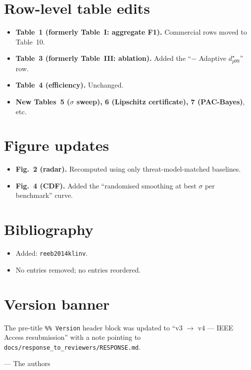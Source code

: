\documentclass[11pt,letterpaper]{article}
\begin{document}
\section{Row-level table edits}
\begin{itemize}[leftmargin=1.4em]
  \item \textbf{Table~1 (formerly Table~I: aggregate F1).} Commercial rows moved to Table~10.
  \item \textbf{Table~3 (formerly Table~III: ablation).} Added the ``$-$ Adaptive $d^\star_{p99}$'' row.
  \item \textbf{Table~4 (efficiency).} Unchanged.
  \item \textbf{New Tables~5 ($\sigma$ sweep), 6 (Lipschitz certificate), 7 (PAC-Bayes)}, etc.
\end{itemize}

\section{Figure updates}
\begin{itemize}[leftmargin=1.4em]
  \item \textbf{Fig.~2 (radar).} Recomputed using only threat-model-matched baselines.
  \item \textbf{Fig.~4 (CDF).} Added the ``randomised smoothing at best $\sigma$ per benchmark'' curve.
\end{itemize}

\section{Bibliography}
\begin{itemize}[leftmargin=1.4em]
  \item Added: \texttt{reeb2014klinv}.
  \item No entries removed; no entries reordered.
\end{itemize}

\section{Version banner}
The pre-title \verb|%% Version| header block was updated to ``v3
$\rightarrow$ v4 --- IEEE Access resubmission'' with a note pointing
to \texttt{docs/response\_to\_reviewers/RESPONSE.md}.

\vspace{6pt}\hfill --- The authors
\end{document}
